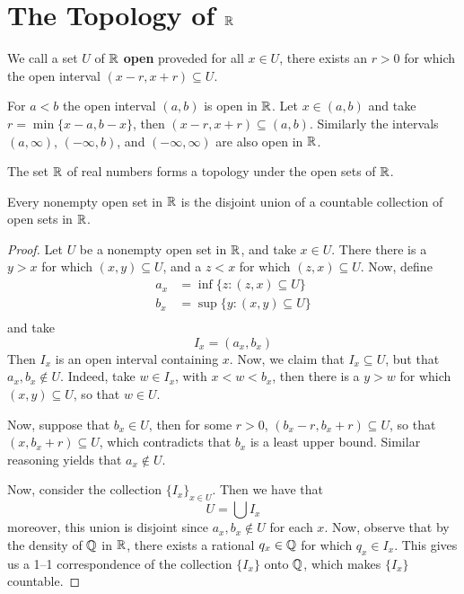 \section{The Topology of $\mathbb{R}$}

\begin{definition}
    We call a set $U$ of  $\mathbb{R}$  \textbf{open} proveded for all $x \in U$, there
    exists an  $r>0$ for which the open interval  $(x-r,x+r) \subseteq U$.
\end{definition}

\begin{example}\label{example_1.1}
    For $a<b$ the open interval $(a,b)$ is open in $\mathbb{R}$. Let  $x \in (a,b)$ and
    take $r=\min{\{x-a,b-x\}}$, then $(x-r,x+r) \subseteq (a,b)$. Similarly the
    intervals $(a,\infty)$, $(-\infty,b)$, and $(-\infty,\infty)$ are also open
    in $\mathbb{R}$.
\end{example}

\begin{lemma}\label{1.2.1}
    The set $\mathbb{R}$ of real numbers forms a topology under the open sets of  $\mathbb{R}$.
\end{lemma}

\begin{lemma}\label{1.2.2}
    Every nonempty open set in $\mathbb{R}$ is the disjoint union of a countable
    collection of open sets in  $\mathbb{R}$.
\end{lemma}
\begin{proof}
    Let $U$ be a nonempty open set in  $\mathbb{R}$, and take  $x \in U$. There there is
    a  $y>x$ for which  $(x,y) \subseteq U$, and a $z<x$ for which  $(z,x)
    \subseteq U$. Now, define
    \begin{align*}
        a_x &=  \inf{\{z : (z,x) \subseteq U\}} \\
        b_x &=  \sup{\{y : (x,y) \subseteq U\}} \\
    \end{align*}
    and take
    \begin{equation*}
        I_x=(a_x,b_x)
    \end{equation*}
    Then $I_x$ is an open interval containing  $x$. Now, we claim that  $I_x
    \subseteq U$, but that  $a_x,b_x \notin U$. Indeed, take  $w \in I_x$, with
     $x<w<b_x$, then there is a  $y>w$ for which  $(x,y) \subseteq U$, so that
     $w \in U$.

     Now, suppose that  $b_x \in U$, then for some  $r>0$,  $(b_x-r,b_x+r)
     \subseteq U$, so that $(x,b_x+r) \subseteq U$, which contradicts that $b_x$
     is a least upper bound. Similar reasoning yields that  $a_x \notin U$.

     Now, consider the collection $\{I_x\}_{x \in U}$. Then we have that
     \begin{equation*}
         U=\bigcup{I_x}
     \end{equation*}
     moreover, this union is disjoint since $a_x,b_x \notin U$ for each  $x$.
     Now, observe that by the density of  $\mathbb{Q}$ in  $\mathbb{R}$, there exists a rational
      $q_x \in \mathbb{Q}$ for which  $q_x \in I_x$. This gives us a 1--1 correspondence
      of the collection  $\{I_x\}$ onto $\mathbb{Q}$, which makes  $\{I_x\}$ countable.
\end{proof}

